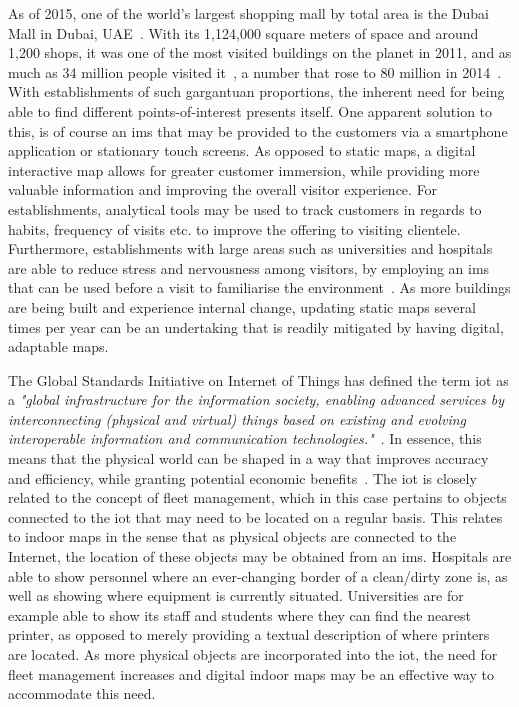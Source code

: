 As of 2015, one of the world's largest shopping mall by total area is the Dubai Mall in Dubai, UAE~\cite{aleksandarjevtic2015}. With its 1,124,000 square meters of space and around 1,200 shops, it was one of the most visited buildings on the planet in 2011, and as much as 34 million people visited it~\cite{anderson2012evolution}, a number that rose to 80 million in 2014~\cite{marysophia2015}. With establishments of such gargantuan proportions, the inherent need for being able to find different points-of-interest presents itself. One apparent solution to this, is of course an \gls{ims} that may be provided to the customers via a smartphone application or stationary touch screens. As opposed to static maps, a digital interactive map allows for greater customer immersion, while providing more valuable information and improving the overall visitor experience. For establishments, analytical tools may be used to track customers in regards to habits, frequency of visits etc. to improve the offering to visiting clientele. Furthermore, establishments with large areas such as universities and hospitals are able to reduce stress and nervousness among visitors, by employing an \gls{ims} that can be used before a visit to familiarise the environment~\cite{mazemaphosp}. As more buildings are being built and experience internal change, updating static maps several times per year can be an undertaking that is readily mitigated by having digital, adaptable maps.


The Global Standards Initiative on Internet of Things has defined the term \gls{iot} as a \textit{"global infrastructure for the information society, enabling advanced services by interconnecting (physical and virtual) things based on existing and evolving interoperable information and communication technologies."}~\cite{itu2016}. In essence, this means that the physical world can be shaped in a way that improves accuracy and efficiency, while granting potential economic benefits~\cite{friess2013internet}. The \gls{iot} is closely related to the concept of fleet management, which in this case pertains to objects connected to the \gls{iot} that may need to be located on a regular basis. This relates to indoor maps in the sense that as physical objects are connected to the Internet, the location of these objects may be obtained from an \gls{ims}. Hospitals are able to show personnel where an ever-changing border of a clean/dirty zone is, as well as showing where equipment is currently situated. Universities are for example able to show its staff and students where they can find the nearest printer, as opposed to merely providing a textual description of where printers are located. As more physical objects are incorporated into the \gls{iot}, the need for fleet management increases and digital indoor maps may be an effective way to accommodate this need. 

